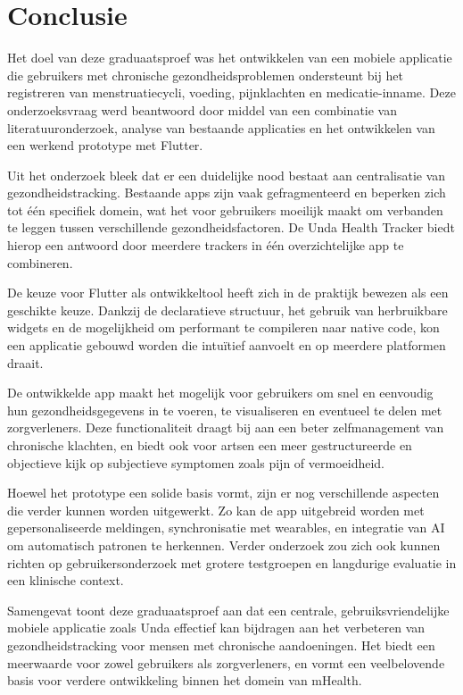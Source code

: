 
\chapter{Conclusie}%
\label{ch:conclusie}

Het doel van deze graduaatsproef was het ontwikkelen van een mobiele applicatie die gebruikers met chronische gezondheidsproblemen ondersteunt bij het registreren van menstruatiecycli, voeding, pijnklachten en medicatie-inname. Deze onderzoeksvraag werd beantwoord door middel van een combinatie van literatuuronderzoek, analyse van bestaande applicaties en het ontwikkelen van een werkend prototype met Flutter.

Uit het onderzoek bleek dat er een duidelijke nood bestaat aan centralisatie van gezondheidstracking. Bestaande apps zijn vaak gefragmenteerd en beperken zich tot één specifiek domein, wat het voor gebruikers moeilijk maakt om verbanden te leggen tussen verschillende gezondheidsfactoren. De Unda Health Tracker biedt hierop een antwoord door meerdere trackers in één overzichtelijke app te combineren.

De keuze voor Flutter als ontwikkeltool heeft zich in de praktijk bewezen als een geschikte keuze. Dankzij de declaratieve structuur, het gebruik van herbruikbare widgets en de mogelijkheid om performant te compileren naar native code, kon een applicatie gebouwd worden die intuïtief aanvoelt en op meerdere platformen draait.

De ontwikkelde app maakt het mogelijk voor gebruikers om snel en eenvoudig hun gezondheidsgegevens in te voeren, te visualiseren en eventueel te delen met zorgverleners. Deze functionaliteit draagt bij aan een beter zelfmanagement van chronische klachten, en biedt ook voor artsen een meer gestructureerde en objectieve kijk op subjectieve symptomen zoals pijn of vermoeidheid.

Hoewel het prototype een solide basis vormt, zijn er nog verschillende aspecten die verder kunnen worden uitgewerkt. Zo kan de app uitgebreid worden met gepersonaliseerde meldingen, synchronisatie met wearables, en integratie van AI om automatisch patronen te herkennen. Verder onderzoek zou zich ook kunnen richten op gebruikersonderzoek met grotere testgroepen en langdurige evaluatie in een klinische context.

Samengevat toont deze graduaatsproef aan dat een centrale, gebruiksvriendelijke mobiele applicatie zoals Unda effectief kan bijdragen aan het verbeteren van gezondheidstracking voor mensen met chronische aandoeningen. Het biedt een meerwaarde voor zowel gebruikers als zorgverleners, en vormt een veelbelovende basis voor verdere ontwikkeling binnen het domein van mHealth.


